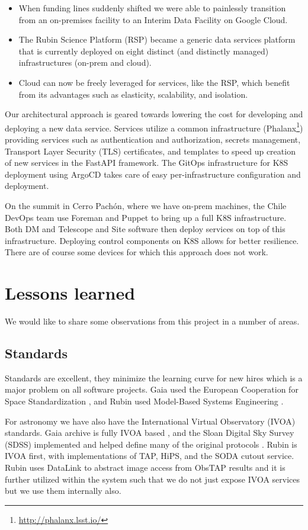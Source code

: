\documentclass[11pt,twoside]{article}
\begin{document}
\begin{itemize}
\item When funding lines suddenly shifted we were able to painlessly transition from an on-premises facility to an Interim Data Facility on Google Cloud.
\item The Rubin Science Platform (RSP) became a generic data services platform that is currently deployed on eight distinct (and distinctly managed) infrastructures (on-prem and cloud).
\item Cloud can now be freely leveraged for services, like the RSP, which benefit from its advantages such as elasticity, scalability, and isolation.
\end{itemize}

Our architectural approach is geared towards lowering the cost for developing and deploying a new data service.
Services utilize a common infrastructure (Phalanx\footnote{\url{http://phalanx.lsst.io/}}) providing services such as authentication and authorization, secrets management, Transport Layer Security (TLS) certificates, and templates to speed up creation of new services in the FastAPI framework.
The GitOps infrastructure for K8S deployment using ArgoCD takes care of easy per-infrastructure configuration and deployment.

On the summit in Cerro Pach\'{o}n, where we have on-prem machines, the Chile DevOps team use Foreman and Puppet to bring up a full K8S infrastructure.
Both DM and Telescope and Site software then deploy services on top of this infrastructure.
Deploying control components on K8S allows for better resilience.
There are of course some devices for which this approach does not work.


\section{Lessons learned}
We would like to share some observations from this project in a number of areas.
\subsection{Standards}
Standards are excellent, they minimize the learning curve for new hires which is a major problem on all software projects.
Gaia used the European Cooperation for Space Standardization \citep[ECSS;][]{2007arXiv0712.0249O}, and
 Rubin used Model-Based Systems Engineering \citep[MBSE;][]{2018SPIE10705E..0US}.

For astronomy we have also have the International Virtual Observatory (IVOA) standards. Gaia archive is fully IVOA based \citep{2019ASPC..523..445S,2015scop.confE...8G}, and the Sloan Digital Sky Survey (SDSS) implemented and helped define many of the original protocols \citep{2005ASPC..347..684T}.
Rubin is IVOA first, with implementations of TAP, HiPS, and the SODA cutout service.
Rubin uses DataLink to abstract image access from ObsTAP results and it is further utilized within the system such that we do not just expose IVOA services but we use them internally also.
\end{document}
